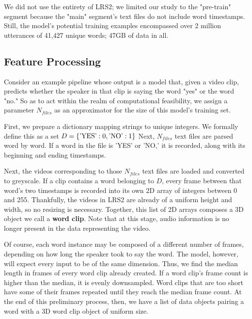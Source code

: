 \documentclass{article}
\begin{document}
We did not use the entirety of LRS2; we limited our study to the "pre-train" segment because the "main" segment's text files do not include word timestamps. Still, the model's potential training examples encompassed over 2 million utterances of 41,427 unique words; 47GB of data in all.

\subsection{Feature Processing}

Consider an example pipeline whose output is a model that, given a video clip, predicts whether the speaker in that clip is saying the word "yes" or the word "no." So as to act within the realm of computational feasibility, we assign a parameter $N_{files}$ as an approximator for the size of this model's training set.

First, we prepare a dictionary mapping strings to unique integers. We formally define this as a set $D = \{\hbox{'YES'}: 0, \hbox{'NO'} : 1\}$ Next, $N_{files}$ text files are parsed word by word. If a word in the file is 'YES' or 'NO,' it is recorded, along with its beginning and ending timestamps.

Next, the videos corresponding to those $N_{files}$ text files are loaded and converted to greyscale. If a clip contains a word belonging to $D$, every frame between that word's two timestamps is recorded into its own 2D array of integers between 0 and 255. Thankfully, the videos in LRS2 are already of a uniform height and width, so no resizing is necessary. Together, this list of 2D arrays composes a 3D object we call a \textbf{word clip}. Note that at this stage, audio information is no longer present in the data representing the video.

Of course, each word instance may be composed of a different number of frames, depending on how long the speaker took to say the word. The model, however, will expect every input to be of the same dimension. Thus, we find the median length in frames of every word clip already created. If a word clip's frame count is higher than the median, it is evenly downsampled. Word clips that are too short have some of their frames repeated until they reach the median frame count. At the end of this preliminary process, then, we have a list of data objects pairing a word with a 3D word clip object of uniform size.
\end{document}
